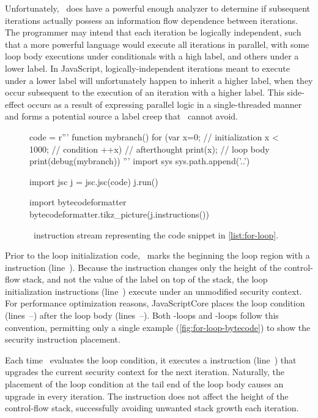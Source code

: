 Unfortunately, \FlowCore\ does have a powerful enough analyzer to determine if subsequent iterations actually possess an information flow dependence between iterations.
The programmer may intend that each iteration be logically independent, such that a more powerful language would execute all iterations in parallel, with some loop body executions under conditionals with a high label, and others under a lower label.
In JavaScript, logically-independent iterations meant to execute under a lower label will unfortunately happen to inherit a higher label, when they occur subsequent to the execution of an iteration with a higher label.
This side-effect occurs as a result of expressing parallel logic in a single-threaded manner and forms a potential source a label creep that \FlowCore\ cannot avoid.

\begin{figure}[h]
\begin{python}
code = r'''
function mybranch() {
  for (var x=0;      // initialization
       x < 1000;     // condition
       ++x) {        // afterthought
    print(x);        // loop body
  }
}
print(debug(mybranch))
'''
import sys
sys.path.append('..')

import jsc
j = jsc.jsc(code)
j.run()

import bytecodeformatter
bytecodeformatter.tikz_picture(j.instructions())
\end{python}
  \caption{\FlowCore\ instruction stream representing the code snippet in \autoref{list:for-loop}.}
  \label{fig:for-loop-bytecode}
\end{figure}

Prior to the loop initialization code, \FlowCore\ marks the beginning the loop region with a \dup instruction (line~).
Because the \dup instruction changes only the height of the control-flow stack, and not the value of the label on top of the stack, the loop initialization instructions (line~) execute under an unmodified security context.
For performance optimization reasons, JavaScriptCore places the loop condition (lines~--) after the loop body (lines~--).
Both -loops and -loops follow this convention, permitting only a single example (\autoref{fig:for-loop-bytecode}) to show the security instruction placement.

Each time \FlowCore\ evaluates the loop condition, it executes a \join instruction (line~) that upgrades the current security context for the next iteration.
Naturally, the placement of the loop condition at the tail end of the loop body causes an upgrade in every iteration.
The \join instruction does not affect the height of the control-flow stack, successfully avoiding unwanted stack growth each iteration.

